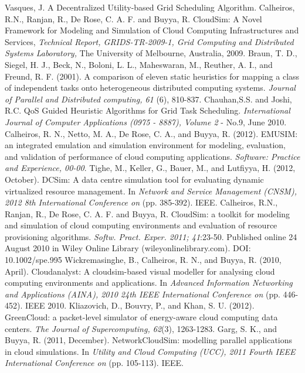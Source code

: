 \documentclass[times, 10pt,twocolumn]{article}
\begin{document}
\begin{thebibliography}{1}

 Vasques, J. A Decentralized Utility-based Grid Scheduling Algorithm.
 Calheiros, R.N., Ranjan, R., De Rose, C. A. F. and Buyya, R. CloudSim: A Novel Framework for Modeling and
 Simulation of Cloud Computing Infrastructures and Services, {\em Technical Report, GRIDS-TR-2009-1, Grid
 Computing and Distributed Systems Laboratory,} The University of Melbourne, Australia, 2009.
 Braun, T. D., Siegel, H. J., Beck, N., Boloni, L. L., Maheswaran, M., Reuther, A. I., and Freund, R. F. (2001). A comparison of eleven static heuristics for mapping a class of independent tasks onto heterogeneous distributed computing systems. {\em Journal of Parallel and Distributed computing, 61} (6), 810-837.
 Chauhan,S.S. and Joshi, R.C. QoS Guided Heuristic Algorithms for Grid Task Scheduling. {\em International Journal of Computer Applications (0975 - 8887), Volume 2} - No.9, June 2010.
 Calheiros, R. N., Netto, M. A., De Rose, C. A., and Buyya, R. (2012). EMUSIM: an integrated emulation and simulation environment for modeling, evaluation, and validation of performance of cloud computing applications. {\em Software: Practice and Experience, 00-00}.
 Tighe, M., Keller, G., Bauer, M., and Lutfiyya, H. (2012, October). DCSim: A data centre simulation tool for evaluating dynamic virtualized resource management. In {\em Network and Service Management (CNSM), 2012 8th International Conference on} (pp. 385-392). IEEE.
 Calheiros, R.N., Ranjan, R., De Rose, C. A. F. and Buyya, R. CloudSim: a toolkit for modeling and simulation of cloud computing environments and evaluation of resource provisioning algorithms. {\em Softw. Pract. Exper. 2011; 41}:23-50. Published online 24 August 2010 in Wiley Online Library (wileyonlinelibrary.com). DOI: 10.1002/spe.995
 Wickremasinghe, B., Calheiros, R. N., and Buyya, R. (2010, April). Cloudanalyst: A cloudsim-based visual modeller for analysing cloud computing environments and applications. In {\em Advanced Information Networking and Applications (AINA), 2010 24th IEEE International Conference on} (pp. 446-452). IEEE 2010.
 Kliazovich, D., Bouvry, P., and Khan, S. U. (2012). GreenCloud: a packet-level simulator of energy-aware cloud computing data centers. {\em The Journal of Supercomputing, 62}(3), 1263-1283.
 Garg, S. K., and Buyya, R. (2011, December). NetworkCloudSim: modelling parallel applications in cloud simulations. In {\em Utility and Cloud Computing (UCC), 2011 Fourth IEEE International Conference on} (pp. 105-113). IEEE.
\end{thebibliography}
\end{document}

